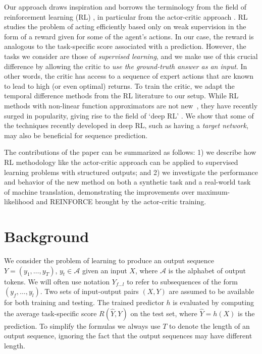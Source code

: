 \documentclass{article} \usepackage{iclr2017_conference,times}
\begin{document}
Our approach draws inspiration and borrows the terminology from the field of
reinforcement learning (RL) \citep{sutton1998introduction}, in particular from
the actor-critic approach \citep{sutton1984temporal,sutton1999policy,barto1983neuronlike}.  RL
studies the problem of acting efficiently based
only on weak supervision in the form of a reward given for some of the agent's actions.
In our case, the reward is analogous to the task-specific score associated with a prediction.
However, the tasks we consider are those of \textit{supervised learning}, and
we make use of this crucial difference by allowing the critic to \textit{use the
ground-truth answer as an input}.
In other words, the critic has access to a sequence of expert actions that are
known to lead to high (or even optimal) returns. 
To train the critic, we adapt the temporal
difference methods from the RL literature \citep{sutton1988learning} to our setup.
While RL methods with non-linear function approximators are not new~\citep{tesauro1994td,miller1995neural}, 
they have recently surged in popularity, giving rise to the field of `deep RL'
\citep{mnih2015human}. We show that some of the techniques recently developed in deep RL, such as having a \textit{target network}, may also be beneficial for sequence prediction.

The contributions of the paper can be summarized as follows: 1) we describe how
RL methodology like the actor-critic approach can be applied to
supervised learning problems with structured outputs; and 2) we investigate the
performance and behavior of the new method on both a synthetic task and a
real-world task of machine translation, demonstrating the improvements over
maximum-likelihood and REINFORCE brought by the actor-critic training.

\section{Background}
We consider the problem of learning to produce an output sequence $Y=(y_1,
\ldots, y_T)$, $y_t \in \mathcal{A}$ given an input $X$, where $\mathcal{A}$ is
the alphabet of output tokens. We will often use notation $Y_{f \ldots l}$ to
refer to subsequences of the form $(y_f, \ldots, y_l)$.
Two sets of input-output pairs $(X, Y)$ are
assumed to be available for both training and testing. The
trained predictor $h$ is evaluated by computing the average task-specific score
$R(\hat{Y}, Y)$ on the test set, where $\hat{Y}=h(X)$ is the prediction.
 To
simplify the formulas we always use $T$ to denote the length of an output sequence, ignoring the fact that the output sequences may have different length.
\end{document}
